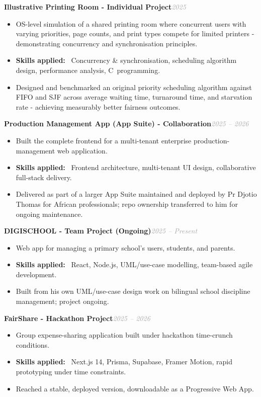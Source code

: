 \documentclass[10pt, a4paper]{article}
\newcommand{\entryhead}[2]{%
  \noindent\textbf{#1}\hfill{\small\textit{\textcolor{darkgray}{#2}}}\\[-4pt]%
}
\newcommand{\blabel}[1]{\textbf{#1}\ }
\begin{document}
\vspace{4pt}
\entryhead{Illustrative Printing Room \normalfont\small- Individual Project}{2025}
\begin{itemize}
  \item OS-level simulation of a shared printing room where concurrent users with varying
        priorities, page counts, and print types compete for limited printers - demonstrating
        concurrency and synchronisation principles.
  \item \blabel{Skills applied:} Concurrency \& synchronisation, scheduling algorithm design,
        performance analysis, C~programming.
  \item Designed and benchmarked an original priority scheduling algorithm against FIFO and SJF
        across average waiting time, turnaround time, and starvation rate - achieving measurably
        better fairness outcomes.
\end{itemize}

\vspace{4pt}
\entryhead{Production Management App (App Suite) \normalfont\small- Collaboration}{2025 -- 2026}
\begin{itemize}
  \item Built the complete frontend for a multi-tenant enterprise production-management web
        application.
  \item \blabel{Skills applied:} Frontend architecture, multi-tenant UI design, collaborative
        full-stack delivery.
  \item Delivered as part of a larger App Suite maintained and deployed by Pr Djotio Thomas for
        African professionals; repo ownership transferred to him for ongoing maintenance.
\end{itemize}

\vspace{4pt}
\entryhead{DIGISCHOOL \normalfont\small- Team Project (Ongoing)}{2025 -- Present}
\begin{itemize}
  \item Web app for managing a primary school's users, students, and parents.
  \item \blabel{Skills applied:} React, Node.js, UML/use-case modelling, team-based agile
        development.
  \item Built from his own UML/use-case design work on bilingual school discipline management;
        project ongoing.
\end{itemize}

\vspace{4pt}
\entryhead{FairShare \normalfont\small- Hackathon Project}{2025 -- 2026}
\begin{itemize}
  \item Group expense-sharing application built under hackathon time-crunch conditions.
  \item \blabel{Skills applied:} Next.js 14, Prisma, Supabase, Framer Motion, rapid prototyping
        under time constraints.
  \item Reached a stable, deployed version, downloadable as a Progressive Web App.
\end{itemize}
\end{document}
